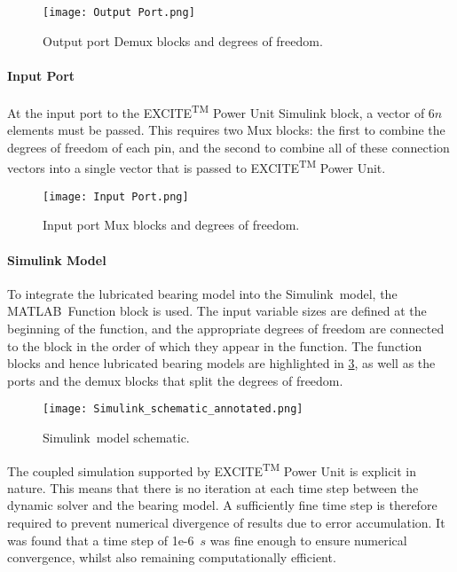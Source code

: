 \begin{figure}  
	\texttt{[image: Output Port.png]}
	\caption{Output port Demux blocks and degrees of freedom.}
	\label{Output Port Simulink}
\end{figure} 

\paragraph{Input Port}

At the input port to the EXCITE\textsuperscript{TM} Power Unit Simulink block, a vector of 6$n$ elements must be passed. This requires two Mux blocks: the first to combine the degrees of freedom of each pin, and the second to combine all of these connection vectors into a single vector that is passed to EXCITE\textsuperscript{TM} Power Unit.

\begin{figure}  
	\texttt{[image: Input Port.png]}
	\caption{Input port Mux blocks and degrees of freedom.}
	\label{Input Port Simulink}
\end{figure} 

\paragraph{Simulink Model}

To integrate the lubricated bearing model into the Simulink\textregistered\ model, the MATLAB\textregistered\ Function block is used. The input variable sizes are defined at the beginning of the function, and the appropriate degrees of freedom are connected to the block in the order of which they appear in the function. The function blocks and hence lubricated bearing models are highlighted in \ref{Simulink_model_schematic}, as well as the ports and the demux blocks that split the degrees of freedom.

\begin{figure}  
	\texttt{[image: Simulink\_schematic\_annotated.png]}
	\caption{Simulink\textregistered\ model schematic.}
	\label{Simulink_model_schematic}
\end{figure} 

The coupled simulation supported by EXCITE\textsuperscript{TM} Power Unit is explicit in nature. This means that there is no iteration at each time step between the dynamic solver and the bearing model. A sufficiently fine time step is therefore required to prevent numerical divergence of results due to error accumulation. It was found that a time step of 1e-6~$s$ was fine enough to ensure numerical convergence, whilst also remaining computationally efficient.

